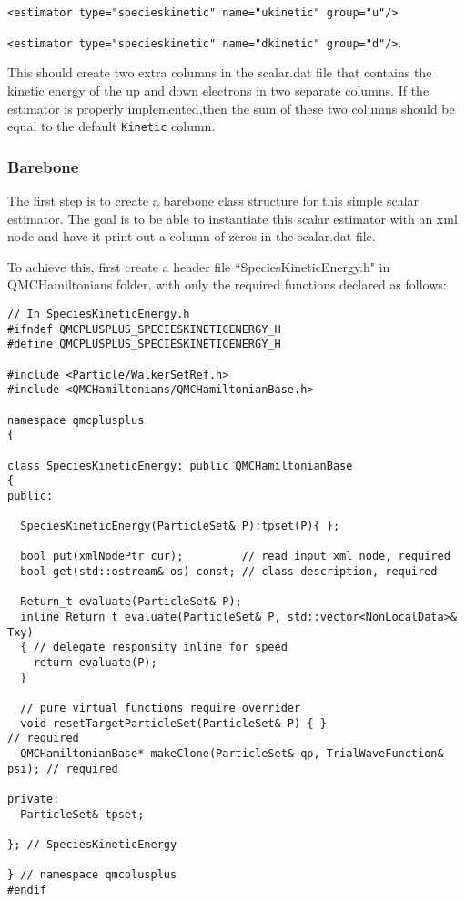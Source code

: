\documentclass[aps,prl,preprint]{revtex4-1}
\begin{document}
\verb|<estimator type="specieskinetic" name="ukinetic" group="u"/>|

\verb|<estimator type="specieskinetic" name="dkinetic" group="d"/>|.

This should create two extra columns in the scalar.dat file that contains the kinetic energy of the up and down electrons in two separate columns. If the estimator is properly implemented,then the sum of these two columns should be equal to the default \verb|Kinetic| column.

\subsubsection{Barebone}

The first step is to create a barebone class structure for this simple scalar estimator. The goal is to be able to instantiate this scalar estimator with an xml node and have it print out a column of zeros in the scalar.dat file. 

To achieve this, first create a header file ``SpeciesKineticEnergy.h" in QMCHamiltonians folder, with only the required functions declared as follows: 

\begin{lstlisting}
// In SpeciesKineticEnergy.h
#ifndef QMCPLUSPLUS_SPECIESKINETICENERGY_H
#define QMCPLUSPLUS_SPECIESKINETICENERGY_H

#include <Particle/WalkerSetRef.h>
#include <QMCHamiltonians/QMCHamiltonianBase.h>

namespace qmcplusplus
{

class SpeciesKineticEnergy: public QMCHamiltonianBase
{
public:
  
  SpeciesKineticEnergy(ParticleSet& P):tpset(P){ };
  
  bool put(xmlNodePtr cur);         // read input xml node, required
  bool get(std::ostream& os) const; // class description, required
  
  Return_t evaluate(ParticleSet& P);
  inline Return_t evaluate(ParticleSet& P, std::vector<NonLocalData>& Txy)
  { // delegate responsity inline for speed
    return evaluate(P);
  } 
  
  // pure virtual functions require overrider
  void resetTargetParticleSet(ParticleSet& P) { }                         // required
  QMCHamiltonianBase* makeClone(ParticleSet& qp, TrialWaveFunction& psi); // required

private:
  ParticleSet& tpset;

}; // SpeciesKineticEnergy

} // namespace qmcplusplus
#endif
\end{lstlisting}
\end{document}
